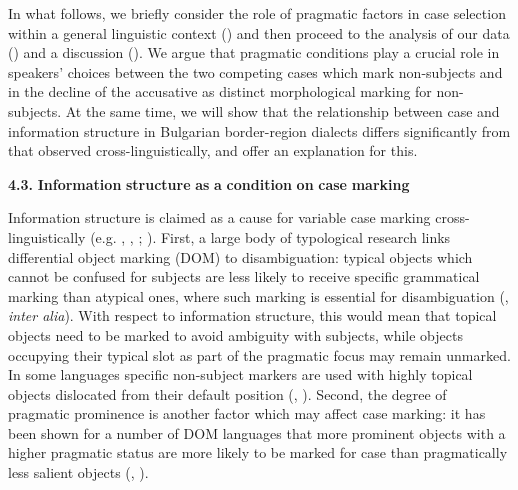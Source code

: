 \documentclass[output=paper]{langscibook}
\begin{document}
In what follows, we briefly consider the role of pragmatic factors in case selection within a general linguistic context () and then proceed to the analysis of our data () and a discussion (). We argue that pragmatic conditions play a crucial role in speakers’ choices between the two competing cases which mark non-subjects and in the decline of the accusative as distinct morphological marking for non-subjects. At the same time, we will show that the relationship between case and information structure in Bulgarian border-region dialects differs significantly from that observed cross-linguistically, and offer an explanation for this. 

\textbf{4.3.} \textbf{Information} \textbf{structure} \textbf{as} \textbf{a} \textbf{condition} \textbf{on} \textbf{case} \textbf{marking}

Information structure is claimed as a cause for variable case marking cross-linguistically (e.g. \citealt{Aikhenvald2010}, \citealt{Iemmolo2010}, \citealt{Valle2011}; \citealt{DalrympleNikolaeva2011}). First, a large body of typological research links differential object marking (DOM) to disambiguation: typical objects which cannot be confused for subjects are less likely to receive specific grammatical marking than atypical ones, where such marking is essential for disambiguation (\citealt{Silverstein1976}, \citealt{Comrie1977} \textit{inter alia}). With respect to information structure, this would mean that topical objects need to be marked to avoid ambiguity with subjects, while objects occupying their typical slot as part of the pragmatic focus may remain unmarked. In some languages specific non-subject markers are used with highly topical objects dislocated from their default position (\citealt{Iemmolo2010}, \citealt{Aikhenvald2003}).  Second, the degree of pragmatic prominence is another factor which may affect case marking: it has been shown for a number of DOM languages that more prominent objects with a higher pragmatic status are more likely to be marked for case than pragmatically less salient objects (\citealt{Aissen2003}, \citealt{Malchukov2008}). 
\end{document}
